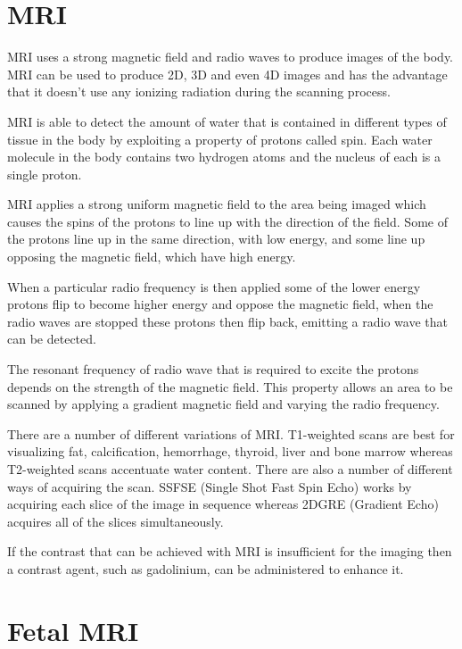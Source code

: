 \section{MRI}\label{background:mri}

MRI uses a strong magnetic field and radio waves to produce images of the body. MRI can be used to produce 2D, 3D and even 4D images and has the advantage that it doesn’t use any ionizing radiation during the scanning process.

MRI is able to detect the amount of water that is contained in different types of tissue in the body by exploiting a property of protons called spin. Each water molecule in the body contains two hydrogen atoms and the nucleus of each is a single proton.

MRI applies a strong uniform magnetic field to the area being imaged which causes the spins of the protons to line up with the direction of the field. Some of the protons line up in the same direction, with low energy, and some line up opposing the magnetic field, which have high energy.

When a particular radio frequency is then applied some of the lower energy protons flip to become higher energy and oppose the magnetic field, when the radio waves are stopped these protons then flip back, emitting a radio wave that can be detected.

The resonant frequency of radio wave that is required to excite the protons depends on the strength of the magnetic field. This property allows an area to be scanned by applying a gradient magnetic field and varying the radio frequency.

There are a number of different variations of MRI. T1-weighted scans are best for visualizing fat, calcification, hemorrhage, thyroid, liver and bone marrow whereas T2-weighted scans accentuate water content.
There are also a number of different ways of acquiring the scan. SSFSE (Single Shot Fast Spin Echo) works by acquiring each slice of the image in sequence whereas 2DGRE (Gradient Echo) acquires all of the slices simultaneously.

If the contrast that can be achieved with MRI is insufficient for the imaging then a contrast agent, such as gadolinium, can be administered to enhance it.

\section{Fetal MRI}\label{background:fetalmri}

